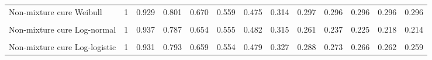 \documentclass[
]{article}
\begin{document}
\begin{table}[H]
{\begin{tabular}[t]{lrrrrrrrrrrrr}
Non-mixture cure Weibull & 1 & 0.929 & 0.801 & 0.670 & 0.559 & 0.475 & 0.314 & 0.297 & 0.296 & 0.296 & 0.296 & 0.296\\
\cellcolor{gray!10}{Mixture cure Log-normal} & \cellcolor{gray!10}{1} & \cellcolor{gray!10}{0.936} & \cellcolor{gray!10}{0.790} & \cellcolor{gray!10}{0.658} & \cellcolor{gray!10}{0.556} & \cellcolor{gray!10}{0.479} & \cellcolor{gray!10}{0.295} & \cellcolor{gray!10}{0.238} & \cellcolor{gray!10}{0.215} & \cellcolor{gray!10}{0.205} & \cellcolor{gray!10}{0.200} & \cellcolor{gray!10}{0.197}\\
Non-mixture cure Log-normal & 1 & 0.937 & 0.787 & 0.654 & 0.555 & 0.482 & 0.315 & 0.261 & 0.237 & 0.225 & 0.218 & 0.214\\
\cellcolor{gray!10}{Mixture cure Log-logistic} & \cellcolor{gray!10}{1} & \cellcolor{gray!10}{0.931} & \cellcolor{gray!10}{0.793} & \cellcolor{gray!10}{0.658} & \cellcolor{gray!10}{0.553} & \cellcolor{gray!10}{0.477} & \cellcolor{gray!10}{0.318} & \cellcolor{gray!10}{0.275} & \cellcolor{gray!10}{0.258} & \cellcolor{gray!10}{0.250} & \cellcolor{gray!10}{0.246} & \cellcolor{gray!10}{0.243}\\
Non-mixture cure Log-logistic & 1 & 0.931 & 0.793 & 0.659 & 0.554 & 0.479 & 0.327 & 0.288 & 0.273 & 0.266 & 0.262 & 0.259\\
\bottomrule
\end{tabular}}
\end{table}
\end{document}
